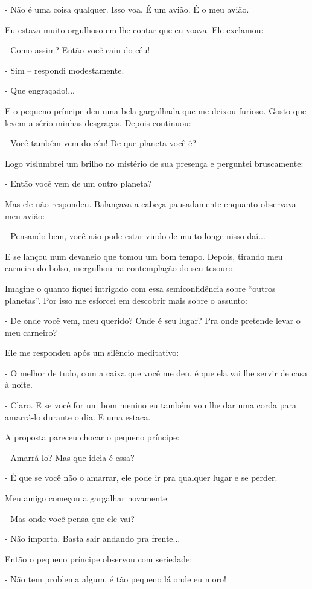 - Não é uma coisa qualquer. Isso voa. É um avião. É o meu avião.

Eu estava muito orgulhoso em lhe contar que eu voava. Ele exclamou:

- Como assim? Então você caiu do céu!

- Sim -- respondi modestamente.

- Que engraçado!...

E o pequeno príncipe deu uma bela gargalhada que me deixou furioso.
Gosto que levem a sério minhas desgraças. Depois continuou:

- Você também vem do céu! De que planeta você é?

Logo vislumbrei um brilho no mistério de sua presença e perguntei
bruscamente:

- Então você vem de um outro planeta?

Mas ele não respondeu. Balançava a cabeça pausadamente enquanto
observava meu avião:

- Pensando bem, você não pode estar vindo de muito longe nisso daí...

E se lançou num devaneio que tomou um bom tempo. Depois, tirando meu
carneiro do bolso, mergulhou na contemplação do seu tesouro.

Imagine o quanto fiquei intrigado com essa semiconfidência sobre
``outros planetas''. Por isso me esforcei em descobrir mais sobre o
assunto:

- De onde você vem, meu querido? Onde é seu lugar? Pra onde pretende
levar o meu carneiro?

Ele me respondeu após um silêncio meditativo:

- O melhor de tudo, com a caixa que você me deu, é que ela vai lhe
servir de casa à noite.

- Claro. E se você for um bom menino eu também vou lhe dar uma corda
para amarrá-lo durante o dia. E uma estaca.

A proposta pareceu chocar o pequeno príncipe:

- Amarrá-lo? Mas que ideia é essa?

- É que se você não o amarrar, ele pode ir pra qualquer lugar e se
perder.

Meu amigo começou a gargalhar novamente:

- Mas onde você pensa que ele vai?

- Não importa. Basta sair andando pra frente...

Então o pequeno príncipe observou com seriedade:

- Não tem problema algum, é tão pequeno lá onde eu moro!

